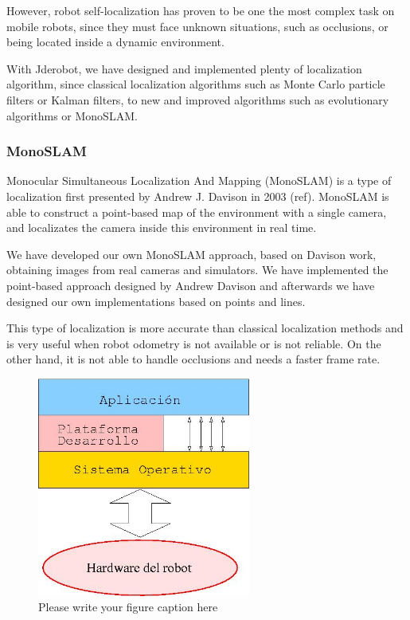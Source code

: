 \documentclass[twocolumn]{svjour3}          %
\begin{document}
However, robot self-localization has proven to be one the most complex task on mobile robots, since they must face unknown situations, such as occlusions, or being located inside a dynamic environment.

With Jderobot, we have designed and implemented plenty of localization algorithm, since classical localization algorithms such as Monte Carlo particle filters or Kalman filters, to new and improved algorithms such as evolutionary algorithms or MonoSLAM.

\subsubsection{MonoSLAM}

Monocular Simultaneous Localization And Mapping (MonoSLAM) is a type of localization first presented by Andrew J. Davison in 2003 (ref). MonoSLAM is able to construct a point-based map of the environment with a single camera, and localizates the camera inside this environment in real time.

We have developed our own MonoSLAM approach, based on Davison work, obtaining images from real cameras and simulators. We have implemented the point-based approach designed by Andrew Davison and afterwards we have designed our own implementations based on points and lines.

This type of localization is more accurate than classical localization methods and is very useful when robot odometry is not available or is not reliable. On the other hand, it is not able to handle occlusions and needs a faster frame rate.

\begin{figure}
  \includegraphics[width=7cm]{figs/programacion3.jpg}
\caption{Please write your figure caption here}
\label{fig:2}       %
\end{figure}
\end{document}

